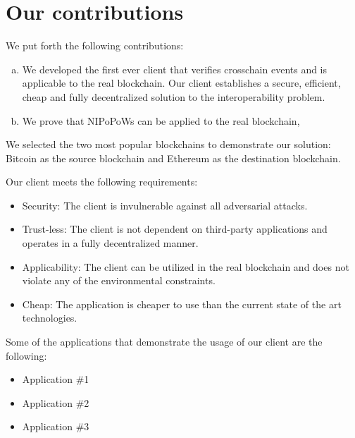 \section{Our contributions}


We put forth the following contributions:

\begin{enumerate}[(a)]

    \item We developed the first ever client that verifies crosschain events
        and is applicable to the real blockchain. Our client establishes a
        secure, efficient, cheap and fully decentralized solution to the
        interoperability problem.

    \item We prove that NIPoPoWs can be applied to the real blockchain,

\end{enumerate}

We selected the two most popular blockchains to demonstrate our solution:
Bitcoin as the source blockchain and Ethereum as the destination blockchain.

Our client meets the following requirements:
\begin{itemize}
    \item
        Security: The client is invulnerable against all adversarial attacks.
    \item
        Trust-less: The client is not dependent on third-party applications
        and operates in a fully decentralized manner.
    \item
        Applicability: The client can be utilized in the real blockchain and
        does not violate any of the environmental constraints.
    \item
        Cheap: The application is cheaper to use than the current state of the
        art technologies.
\end{itemize}

Some of the applications that demonstrate the usage of our client
are the following:

\begin{itemize}
    \item{Application \#1}
    \item{Application \#2}
    \item{Application \#3}
\end{itemize}

